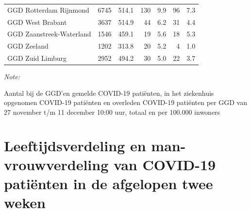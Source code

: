 \documentclass[
  english,
  man,floatsintext]{apa6}
\begin{document}
\begin{table}[H]
\begin{threeparttable}
\begin{tabular}{lrrrrrr}
GGD Rotterdam Rijnmond & 6745 & 514.1 & 130 & 9.9 & 96 & 7.3\\
GGD West Brabant & 3637 & 514.9 & 44 & 6.2 & 31 & 4.4\\
GGD Zaanstreek-Waterland & 1546 & 459.1 & 19 & 5.6 & 18 & 5.3\\
GGD Zeeland & 1202 & 313.8 & 20 & 5.2 & 4 & 1.0\\
GGD Zuid Limburg & 2952 & 494.2 & 30 & 5.0 & 22 & 3.7\\
\bottomrule
\end{tabular}
\begin{tablenotes}
\item \textit{Note: } 
\item Aantal bij de GGD’en gemelde COVID-19 patiënten, in het ziekenhuis opgenomen COVID-19 patiënten en overleden COVID-19 patiënten per GGD van 27 november t/m 11 december 10:00 uur, totaal en per 100.000 inwoners
\end{tablenotes}
\end{threeparttable}
\endgroup{}
\end{table}

\newpage

\hypertarget{leeftijdsverdeling-en-man-vrouwverdeling-van-covid-19-patiuxebnten-in-de-afgelopen-twee-weken}{%
\section{Leeftijdsverdeling en man-vrouwverdeling van COVID-19 patiënten in de afgelopen twee weken}\label{leeftijdsverdeling-en-man-vrouwverdeling-van-covid-19-patiuxebnten-in-de-afgelopen-twee-weken}}
\end{document}
